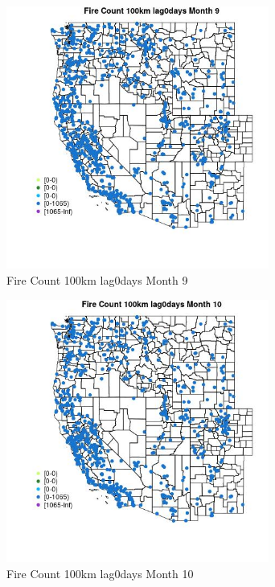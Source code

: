 \begin{figure} 
\centering  
\includegraphics[width=0.77\textwidth]{Code_Outputs/Report_ML_input_PM25_Step4_part_f_de_duplicated_aves_prioritize_24hr_obswNAs_MapObsMo9Fire_Count_100km_lag0days.jpg} 
\caption{\label{fig:Report_ML_input_PM25_Step4_part_f_de_duplicated_aves_prioritize_24hr_obswNAsMapObsMo9Fire_Count_100km_lag0days}Fire Count 100km lag0days Month 9} 
\end{figure} 
 

\begin{figure} 
\centering  
\includegraphics[width=0.77\textwidth]{Code_Outputs/Report_ML_input_PM25_Step4_part_f_de_duplicated_aves_prioritize_24hr_obswNAs_MapObsMo10Fire_Count_100km_lag0days.jpg} 
\caption{\label{fig:Report_ML_input_PM25_Step4_part_f_de_duplicated_aves_prioritize_24hr_obswNAsMapObsMo10Fire_Count_100km_lag0days}Fire Count 100km lag0days Month 10} 
\end{figure} 
 

